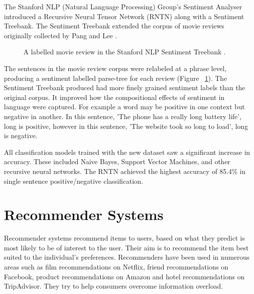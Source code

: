 The Stanford NLP (Natural Language Processing) Group's Sentiment Analyser \cite{stanfordSentiment2013} introduced a Recursive Neural Tensor Network (RNTN) along with a Sentiment Treebank. The Sentiment Treebank extended the corpus of movie reviews originally collected by Pang and Lee \cite{panglee2004}.

\begin{figure}[h!]
\centering
{}
\caption{\label{fig:treebank} A labelled movie review in the Stanford NLP Sentiment Treebank \cite{stanfordSentiment2013}.}
\end{figure}

The sentences in the movie review corpus were relabeled at a phrase level, producing a sentiment labelled parse-tree for each review (Figure ~\ref{fig:treebank}). The Sentiment Treebank produced had more finely grained sentiment labels than the original corpus. It improved how the compositional effects of sentiment in language were captured. For example a word may be positive in one context but negative in another. In this sentence, 'The phone has a really long battery life', long is positive, however in this sentence, 'The website took so long to load', long is negative.

All classification models trained with the new dataset saw a significant increase in accuracy. These included Naive Bayes, Support Vector Machines, and other recursive neural networks. The RNTN achieved the highest accuracy of 85.4\% in single sentence positive/negative classification.

\section{Recommender Systems}

Recommender systems recommend items to users, based on what they predict is most likely to be of interest to the user. Their aim is to recommend the item best suited to the individual's preferences. Recommenders have been used in numerous areas such as film recommendations on Netflix, friend recommendations on Facebook, product recommendations on Amazon and hotel recommendations on TripAdvisor. They try to help consumers overcome information overload.

